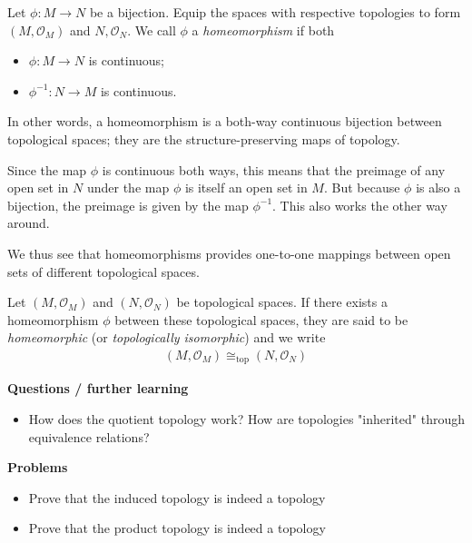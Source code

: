 \begin{definition}[Homeomorphism]
    Let \(\phi : M \to N\) be a bijection. Equip the spaces with respective topologies to form \((M, \mathcal{O} _M)\) and \(N, \mathcal{O} _N\). We call \(\phi \) a \textit{homeomorphism} if both \begin{itemize}
        \item \(\phi : M \to N\) is continuous;
        \item \(\phi ^{-1} : N \to M\) is continuous.
    \end{itemize}    
\end{definition}
In other words, a homeomorphism is a both-way continuous bijection between topological spaces; they are the structure-preserving maps of topology.

\begin{remark}
    Since the map \(\phi \) is continuous both ways, this means that the preimage of any open set in \(N\) under the map \(\phi \) is itself an open set in \(M\). But because \(\phi \) is also a bijection, the preimage is given by the map \(\phi ^{-1}\). This also works the other way around.
    
    We thus see that homeomorphisms provides one-to-one mappings between open sets of different topological spaces.
\end{remark}

\begin{definition}[Homeomorphic]
    Let \((M, \mathcal{O} _M)\) and \((N, \mathcal{O} _N)\) be topological spaces. If there exists a homeomorphism \(\phi\) between these topological spaces, they are said to be \textit{homeomorphic} (or \textit{topologically isomorphic}) and we write \begin{align*}
        (M, \mathcal{O} _M) \cong_{\text{top}} (N, \mathcal{O} _N) 
    \end{align*}    
\end{definition}

\textbf{Questions / further learning} 
\begin{itemize}
    \item How does the quotient topology work? How are topologies "inherited" through equivalence relations?
\end{itemize}
\textbf{Problems}
\begin{itemize}
    \item Prove that the induced topology is indeed a topology
    \item Prove that the product topology is indeed a topology
\end{itemize} 


